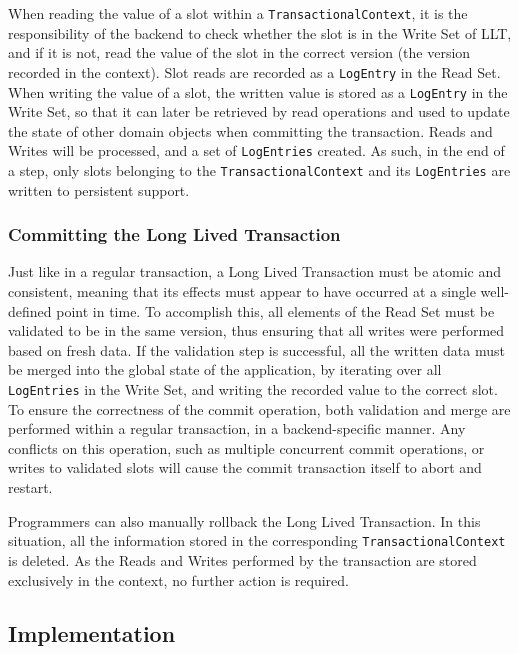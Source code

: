 \documentclass{llncs}
\begin{document}
When reading the value of a slot within a
\texttt{TransactionalContext}, it is the responsibility of the backend
to check whether the slot is in the Write Set of LLT, and if it is
not, read the value of the slot in the correct version (the version
recorded in the context). Slot reads are recorded as a
\texttt{LogEntry} in the Read Set. When writing the value of a slot,
the written value is stored as a \texttt{LogEntry} in the Write Set,
so that it can later be retrieved by read operations and used to
update the state of other domain objects when committing the
transaction. Reads and Writes will be processed, and a set of
\texttt{LogEntries} created.  As such, in the end of a step, only
slots belonging to the \texttt{TransactionalContext} and its
\texttt{LogEntries} are written to persistent support.

\subsubsection{Committing the Long Lived Transaction}

Just like in a regular transaction, a Long Lived Transaction must be
atomic and consistent, meaning that its effects must appear to have
occurred at a single well-defined point in time. To accomplish this,
all elements of the Read Set must be validated to be in the same
version, thus ensuring that all writes were performed based on fresh
data. If the validation step is successful, all the written data must
be merged into the global state of the application, by iterating over
all \texttt{LogEntries} in the Write Set, and writing the recorded
value to the correct slot. To ensure the correctness of the commit
operation, both validation and merge are performed within a regular
transaction, in a backend-specific manner. Any conflicts on this
operation, such as multiple concurrent commit operations, or writes to
validated slots will cause the commit transaction itself to abort and
restart.

Programmers can also manually rollback the Long Lived Transaction. In
this situation, all the information stored in the corresponding
\texttt{TransactionalContext} is deleted. As the Reads and Writes
performed by the transaction are stored exclusively in the context, no
further action is required.

\subsection{Implementation}
\label{sec:impl}
\end{document}
